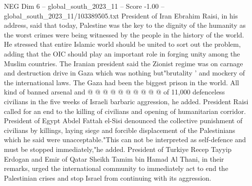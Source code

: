 \begin{textsample}{NEG Dim 6 – global\_south\_2023\_11 – Score -1.00 – global\_south\_2023\_11/103389505.txt}
President of Iran Ebrahim Raisi, in his address, said that today, Palestine was the key to the dignity of the humanity as the worst crimes were being witnessed by the people in the history of the world.
He stressed that entire Islamic world should be united to sort out the problem, adding that the OIC should play an important role in forging unity among the Muslim countries.
The Iranian president said the Zionist regime was on carnage and destruction drive in Gaza which was nothing but"brutality ' and mockery of the international laws.
The Gaza had been the biggest prison in the world.
All kind of banned arsenal and @ @ @ @ @ @ @ @ @ @ of 11,000 defenceless civilians in the five weeks of Israeli barbaric aggression, he added.
President Raisi called for an end to the killing of civilians and opening of humanitarian corridor.
President of Egypt Abdel Fattah el-Sisi denounced the collective punishment of civilians by killings, laying siege and forcible displacement of the Palestinians which he said were unacceptable."This can not be interpreted as self-defence and must be stopped immediately,"he added.
President of Turkiye Recep Tayyip Erdogan and Emir of Qatar Sheikh Tamim bin Hamad Al Thani, in their remarks, urged the international community to immediately act to end the Palestinian crises and stop Israel from continuing with its aggression.

\end{textsample}
